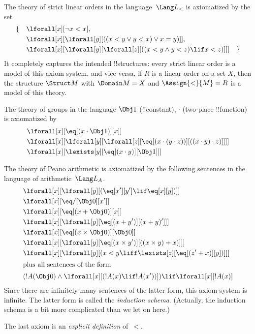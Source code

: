 \documentclass[../../../include/open-logic-section]{subfiles}
\begin{document}


\begin{ex}
The theory of strict linear orders in the language~$\Lang L_<$ is
axiomatized by the set
\begin{align*}
\{\quad & \lforall[x][\lnot x < x], \\
& \lforall[x][\lforall[y][((x < y \lor y <
    x) \lor x = y)]], \\
& \lforall[x][\lforall[y][\lforall[z][((x < y
      \land y < z) \lif x < z)]]] \quad \}
\end{align*}
It completely captures the intended !!{structure}s: every strict
linear order is a model of this axiom system, and vice versa, if $R$
is a linear order on a set $X$, then the structure $\Struct M$ with
$\Domain M = X$ and $\Assign{<}{M} = R$ is a model of this theory.
\end{ex}

\begin{ex}
The theory of groups in the language $\Obj 1$ (!!{constant}), $\cdot$
(two-place !!{function}) is axiomatized by
\begin{align*}
& \lforall[x][\eq[(x \cdot \Obj 1)][x]]\\
& \lforall[x][\lforall[y][\lforall[z][\eq[(x \cdot (y \cdot z))][((x
          \cdot y) \cdot z)]]]]\\
& \lforall[x][\lexists[y][\eq[(x \cdot y)][\Obj 1]]]
\end{align*}
\end{ex}

\begin{ex}
The theory of Peano arithmetic is axiomatized by the following
sentences in the language of arithmetic~$\Lang L_A$.
\begin{align*}
& \lforall[x][\lforall[y][(\eq[x'][y'] \lif \eq[x][y])]]\\
& \lforall[x][\eq/[\Obj 0][x']]\\
& \lforall[x][\eq[(x + \Obj 0)][x]]\\
& \lforall[x][\lforall[y][\eq[(x + y')][(x + y)']]]\\
& \lforall[x][\eq[(x \times \Obj 0)][\Obj 0]]\\
& \lforall[x][\lforall[y][\eq[(x \times y')][((x \times y) + x)]]]\\
& \lforall[x][\lforall[y][(x < y \liff \lexists[z][\eq[(z' + x)][y])]]]\\
\intertext{plus all sentences of the form}
& (!A(\Obj 0) \land \lforall[x][(!A(x) \lif !A(x'))]) \lif \lforall[x][!A(x)]
\end{align*}
Since there are infinitely many sentences of the latter form, this
axiom system is infinite.  The latter form is called the
\emph{induction schema}. (Actually, the induction schema is a bit more
complicated than we let on here.)

The last axiom is an \emph{explicit definition} of~$<$.
\end{ex}
\end{document}
